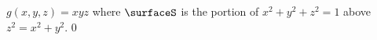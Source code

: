 {$g(x,y,z)=xyz$ where $\surfaceS$ is the portion of $x^2+y^2+z^2=1$ above $z^2 = x^2 + y^2$.
}
{$0$}
